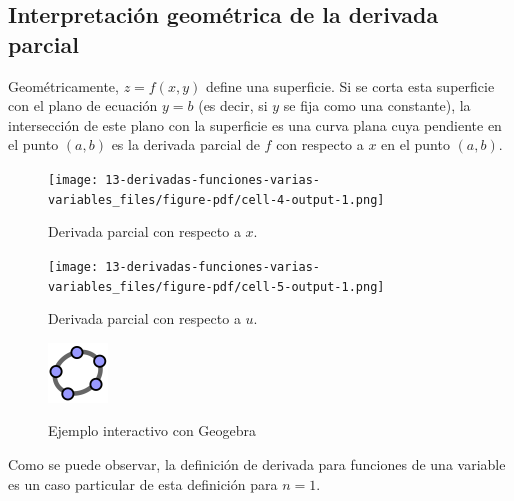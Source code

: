 \documentclass[
  a4paper,
]{scrreport}
\theoremstyle{plain}
\theoremstyle{plain}
\theoremstyle{definition}
\theoremstyle{definition}
\theoremstyle{plain}
\theoremstyle{definition}
\theoremstyle{remark}
\begin{document}
\hypertarget{interpretaciuxf3n-geomuxe9trica-de-la-derivada-parcial}{%
\subsection{Interpretación geométrica de la derivada
parcial}\label{interpretaciuxf3n-geomuxe9trica-de-la-derivada-parcial}}

Geométricamente, \(z=f(x,y)\) define una superficie. Si se corta esta
superficie con el plano de ecuación \(y=b\) (es decir, si \(y\) se fija
como una constante), la intersección de este plano con la superficie es
una curva plana cuya pendiente en el punto \((a,b)\) es la derivada
parcial de \(f\) con respecto a \(x\) en el punto \((a,b)\).

\begin{figure}

{\centering \texttt{[image: 13-derivadas-funciones-varias-variables\_files/figure-pdf/cell-4-output-1.png]}

}

\caption{Derivada parcial con respecto a \(x\).}

\end{figure}

\begin{figure}

{\centering \texttt{[image: 13-derivadas-funciones-varias-variables\_files/figure-pdf/cell-5-output-1.png]}

}

\caption{Derivada parcial con respecto a \(u\).}

\end{figure}

\begin{figure}

{\centering 

\href{https://www.geogebra.org/classic/ywur7vzr}{\includegraphics{img/logos/logo-geogebra.png}}

}

\caption{Ejemplo interactivo con Geogebra}

\end{figure}

Como se puede observar, la definición de derivada para funciones de una
variable es un caso particular de esta definición para \(n=1\).
\end{document}
